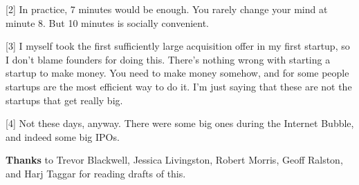 [2] In practice, 7 minutes would be enough. You rarely change
                  your mind at minute 8. But 10 minutes is socially
                  convenient.

[3] I myself took the first sufficiently large acquisition
                  offer in my first startup, so I don't blame founders for doing
                  this. There's nothing wrong with starting a startup to make
                  money. You need to make money somehow, and for some people
                  startups are the most efficient way to do it. I'm just saying
                  that these are not the startups that get really big.

[4] Not these days, anyway. There were some big ones during the
                  Internet Bubble, and indeed some big IPOs.



\textbf{Thanks}
                  to Trevor Blackwell, Jessica Livingston, Robert Morris, Geoff
                  Ralston, and Harj Taggar for reading drafts of this.


              
            
          
            
              
                


                  
              
            
          
